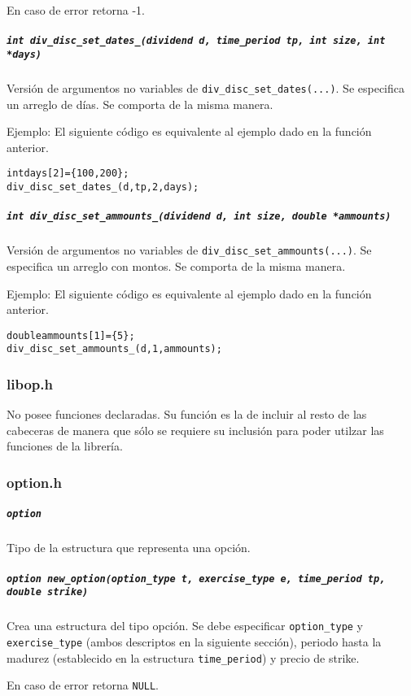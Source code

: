 \documentclass[12pt,a4paper,final]{article}
\begin{document}
					En caso de error retorna -1.
					
			\subparagraph{\texttt{int div\_disc\_set\_dates\_(dividend d, time\_period tp, int size, int *days)}}
				Versión de argumentos no variables de \texttt{div\_disc\_set\_dates(...)}.
				Se especifica un arreglo de días.
				Se comporta de la misma manera.
									
				Ejemplo: El siguiente código es equivalente al ejemplo dado en la función anterior.
					\begin{alltt}
						int days[2] = \{ 100, 200 \};
						div\_disc\_set\_dates\_(d, tp, 2, days);
					\end{alltt}		
			
			\subparagraph{\texttt{int div\_disc\_set\_ammounts\_(dividend d, int size, double *ammounts)}}
				Versión de argumentos no variables de \texttt{div\_disc\_set\_ammounts(...)}.
				Se especifica un arreglo con montos.
				Se comporta de la misma manera.	
					
				Ejemplo: El siguiente código es equivalente al ejemplo dado en la función anterior.
					\begin{alltt}
						double ammounts[1] = \{ 5 \};
						div\_disc\_set\_ammounts\_(d, 1, ammounts);
					\end{alltt}	
			
			
		\subsubsection{libop.h}
			No posee funciones declaradas. Su función es la de incluir al resto de las cabeceras
			de manera que sólo se requiere su inclusión para poder utilzar las funciones de la librería.
			
		\subsubsection{option.h}

			\subparagraph{\texttt{option}} 
				Tipo de la estructura que representa una opción.
									
			\subparagraph{\texttt{option new\_option(option\_type t, exercise\_type e, time\_period tp, double strike)}}			
				Crea una estructura del tipo opción. Se debe especificar \texttt{option\_type} y
				\texttt{exercise\_type} (ambos descriptos en la siguiente sección), periodo hasta la madurez
				(establecido en la estructura \texttt{time\_period}) y precio de strike.
					
				En caso de error retorna \texttt{NULL}.
				
\end{document}
